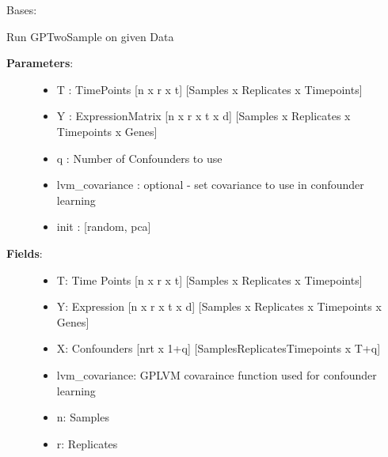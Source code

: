 \documentclass[letterpaper,10pt,english]{sphinxmanual}
\begin{document}
\begin{fulllineitems}
\label{base:gptwosample.confounder.confounder.TwoSampleConfounder}
Bases: {\hyperref[base:gptwosample.twosample.twosample.TwoSample]{}}

Run GPTwoSample on given Data
\begin{description}
\item[{\textbf{Parameters}:}] \leavevmode\begin{itemize}
\item {} 
T : TimePoints {[}n x r x t{]}    {[}Samples x Replicates x Timepoints{]}

\item {} 
Y : ExpressionMatrix {[}n x r x t x d{]}      {[}Samples x Replicates x Timepoints x Genes{]}

\item {} 
q : Number of Confounders to use

\item {} 
lvm\_covariance : optional - set covariance to use in confounder learning

\item {} 
init : {[}random, pca{]}

\end{itemize}

\item[{\textbf{Fields}:}] \leavevmode\begin{itemize}
\item {} 
T: Time Points {[}n x r x t{]} {[}Samples x Replicates x Timepoints{]}

\item {} 
Y: Expression {[}n x r x t x d{]} {[}Samples x Replicates x Timepoints x Genes{]}

\item {} 
X: Confounders {[}nrt x 1+q{]} {[}SamplesReplicatesTimepoints x T+q{]}

\item {} 
lvm\_covariance: GPLVM covaraince function used for confounder learning

\item {} 
n: Samples

\item {} 
r: Replicates


\end{itemize}
\end{description}
\end{fulllineitems}
\end{document}
